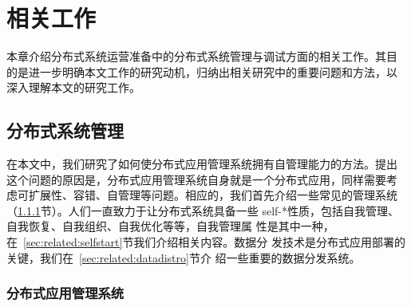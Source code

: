 \chapter{相关工作}
\label{chap:related}

本章介绍分布式系统运营准备中的分布式系统管理与调试方面的相关工作。其目
的是进一步明确本文工作的研究动机，归纳出相关研究中的重要问题和方法，以
深入理解本文的研究工作。






\section{分布式系统管理}


% 
% 
% 
% 
% 
% 

在本文中，我们研究了如何使分布式应用管理系统拥有自管理能力的方法。提出
这个问题的原因是，分布式应用管理系统自身就是一个分布式应用，同样需要考
虑可扩展性、容错、自管理等问题。相应的，我们首先介绍一些常见的管理系统
（\ref{sec:related:mgmtsys}节）。人们一直致力于让分布式系统具备一些
self-*性质，包括自我管理、自我恢复、自我组织、自我优化等等，自我管理属
性是其中一种，在~\ref{sec:related:selfstart}节我们介绍相关内容。数据分
发技术是分布式应用部署的关键，我们在~\ref{sec:related:datadistro}节介
绍一些重要的数据分发系统。

\subsection{分布式应用管理系统}
\label{sec:related:mgmtsys}

